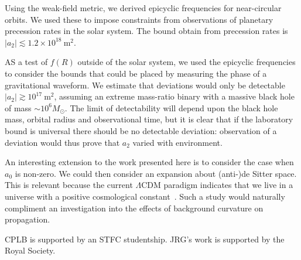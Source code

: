 \documentclass[aps,prd,amsfonts,amssymb,amsmath,nofootinbib,reprint,showpacs]{revtex4-1}
\newcommand{\units}[1]{\ensuremath{~\mathrm{#1}}}
\begin{document}
Using the weak-field metric, we derived epicyclic frequencies for near-circular orbits. We used these to impose constraints from observations of planetary precession rates in the solar system. The bound obtain from precession rates is $|a_2| \lesssim 1.2 \times 10^{18}\units{m^2}$. 

AS a test of $f(R)$ outside of the solar system, we used the epicyclic frequencies to consider the bounds that could be placed by measuring the phase of a gravitational waveform. We estimate that deviations would only be detectable $|a_2| \gtrsim 10^{17}\units{m^2}$, assuming an extreme mass-ratio binary with a massive black hole of mass $\sim 10^6 M_\odot$. The limit of detectability will depend upon the black hole mass, orbital radius and observational time, but it is clear that if the laboratory bound is universal there should be no detectable deviation: observation of a deviation would thus prove that $a_2$ varied with environment.

An interesting extension to the work presented here is to consider the case when $a_0$ is non-zero. We could then consider an expansion about (anti-)de Sitter space. This is relevant because the current $\Lambda$CDM paradigm indicates that we live in a universe with a positive cosmological constant~\cite{Hinshaw2009}. Such a study would naturally compliment an investigation into the effects of background curvature on propagation.

\begin{acknowledgments}
CPLB is supported by an STFC studentship. JRG's work is supported by the Royal Society.
\end{acknowledgments}


\end{document}
